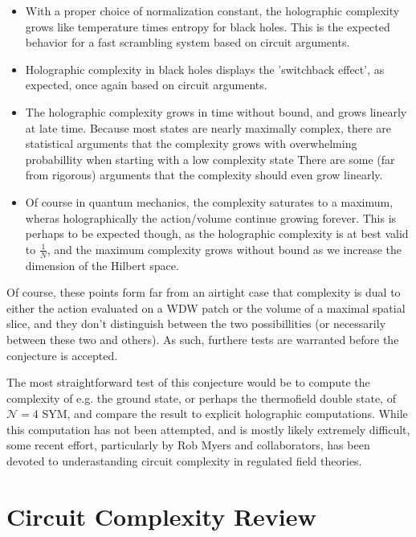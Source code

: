 \documentclass[12pt]{amsart}
\begin{document}
\begin{itemize}

\item With a proper choice of normalization constant, the holographic complexity grows like temperature times entropy for black holes. This is the expected behavior for a fast scrambling system based on circuit arguments. 

\item Holographic complexity in black holes displays the 'switchback effect', as expected, once again based on circuit arguments. 

\item The holographic complexity grows in time without bound, and grows linearly at late time. Because most states are nearly maximally complex, there are statistical arguments that the complexity grows with overwhelming probabillity when starting with a low complexity state There are some (far from rigorous) arguments that the complexity should even grow linearly.

\item Of course in quantum mechanics, the complexity saturates to a maximum, wheras holographically the action/volume continue growing forever. This is perhaps to be expected though, as the holographic complexity is at best valid to $\frac{1}{N}$, and the maximum complexity grows without bound as we increase the dimension of the Hilbert space. 

\end{itemize}

Of course, these points form far from an airtight case that complexity  is dual to either the action evaluated on a WDW patch or the volume of a maximal spatial slice, and they don't distinguish between the two possibillities (or necessarily between these two and others). As such, furthere tests are warranted before the conjecture is accepted.

The most straightforward test of this conjecture would be to compute the complexity of e.g. the ground state, or perhaps the thermofield double state, of $\mathcal{N} = 4$ SYM, and compare the result to explicit holographic computations. While this computation has not been attempted, and is mostly likely extremely difficult, some recent effort, particularly by Rob Myers and collaborators, has been devoted to underastanding circuit complexity in regulated field theories. 

\section{Circuit Complexity Review}
\end{document}
